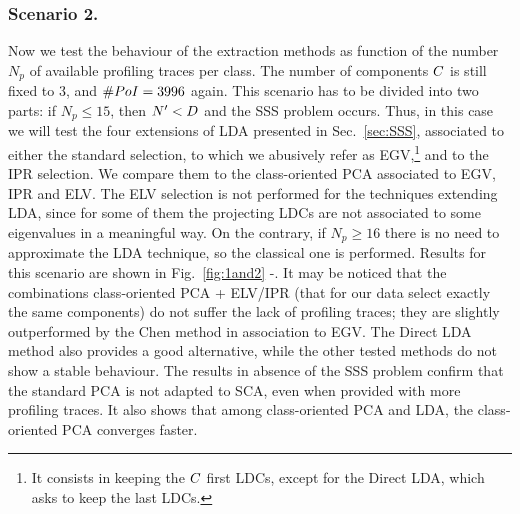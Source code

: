 \subsubsection{Scenario 2.}
Now we test the behaviour of the extraction methods as function of the number $N_p$ of available profiling traces per class. The number of components $\newTraceLength$ is still fixed to 3, and $\numPoI=3996$ again. This scenario has to be divided into two parts: if $N_p\leq 15$, then $\numTraces[]'<\traceLength$ and the SSS problem occurs. Thus, in this case we will test the four extensions of LDA presented in Sec.~\ref{sec:SSS}, associated to either the standard selection, to which we abusively refer as EGV,\footnote{It consists in keeping the $\newTraceLength$ first LDCs, except for the Direct LDA, which asks to keep the last LDCs.} and to the IPR selection.  We compare them to the class-oriented PCA associated to EGV, IPR and ELV. The ELV selection is not performed for the techniques extending LDA, since for some of them the projecting LDCs are not associated to some eigenvalues in a meaningful way. On the contrary, if $N_p\geq 16$ there is no need to approximate the LDA technique, so the classical one is performed. Results for this scenario are shown in Fig.~\ref{fig:1and2} -. It may be noticed that the combinations class-oriented PCA + ELV/IPR (that for our data select exactly the same components) do not suffer the lack of profiling traces; they are slightly outperformed by the Chen method in association to EGV. The Direct LDA method also provides a good alternative, while the other tested methods do not show a stable behaviour. The results in absence of the SSS problem confirm that the standard PCA is not adapted to SCA, even when provided with more profiling traces. It also shows that among class-oriented PCA and LDA, the class-oriented PCA converges faster.

